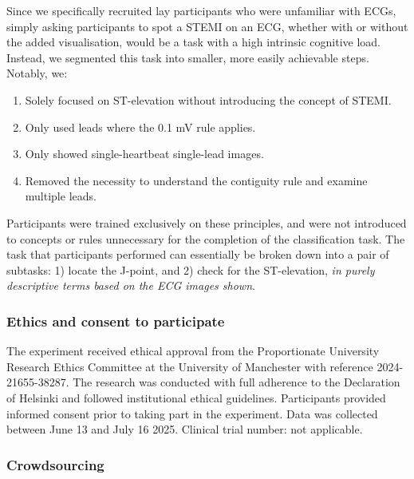 \documentclass[
  10pt,
  letterpaper,
]{article}
\begin{document}
Since we specifically recruited lay participants who were unfamiliar
with ECGs, simply asking participants to spot a STEMI on an ECG, whether
with or without the added visualisation, would be a task with a high
intrinsic cognitive load. Instead, we segmented this task into smaller,
more easily achievable steps. Notably, we:

\begin{enumerate}
\def\labelenumi{\arabic{enumi}.}
\item
  Solely focused on ST-elevation without introducing the concept of STEMI.
\item
  Only used leads where the 0.1 mV rule applies.
\item
  Only showed single-heartbeat single-lead images.
\item
  Removed the necessity to understand the contiguity rule and examine
  multiple leads.
\end{enumerate}

Participants were trained exclusively on these principles, and were not
introduced to concepts or rules unnecessary for the completion of the
classification task. The task that participants performed can
essentially be broken down into a pair of subtasks: 1) locate the
J-point, and 2) check for the ST-elevation,
\emph{in purely descriptive terms based on the ECG images shown}.

\subsubsection{Ethics and consent to
participate}\label{ethics-and-consent-to-participate}

The experiment received ethical approval from the Proportionate
University Research Ethics Committee at the University of Manchester
with reference 2024-21655-38287. The research was conducted with full
adherence to the Declaration of Helsinki and followed institutional
ethical guidelines. Participants provided informed consent prior to
taking part in the experiment. Data was collected between June 13 and
July 16 2025. Clinical trial number: not applicable.

\subsubsection{Crowdsourcing}\label{sec-crowdsourcing}
\end{document}
